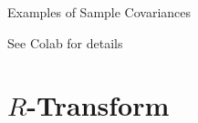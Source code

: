 \documentclass[10pt]{beamer}
\begin{document}
\begin{frame}{Examples of Sample Covariances}
\begin{center}
See Colab for details
\end{center}
\end{frame}



    

\section{$R$-Transform}
\end{document}
